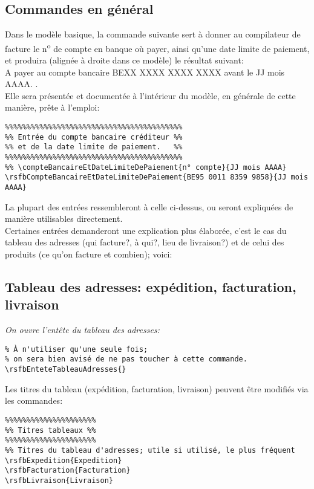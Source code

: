 \documentclass[a4paper,10pt]{article}
\begin{document}
 
\subsection{Commandes en général}

Dans le modèle basique, la commande suivante sert à donner au compilateur de facture le n\textsuperscript{o} de compte en banque où payer, ainsi qu'une date limite de paiement, et produira (alignée à droite dans ce modèle) le résultat suivant: \\

\og A payer au compte bancaire BEXX XXXX XXXX XXXX avant le JJ mois AAAA. \fg. \\

Elle sera présentée et documentée à l'intérieur du modèle, en générale de cette manière, prête à l'emploi:

\begin{lstlisting}
%%%%%%%%%%%%%%%%%%%%%%%%%%%%%%%%%%%%%%%%%
%% Entrée du compte bancaire créditeur %%
%% et de la date limite de paiement.   %%
%%%%%%%%%%%%%%%%%%%%%%%%%%%%%%%%%%%%%%%%%
%% \compteBancaireEtDateLimiteDePaiement{n° compte}{JJ mois AAAA}
\rsfbCompteBancaireEtDateLimiteDePaiement{BE95 0011 8359 9858}{JJ mois AAAA}
\end{lstlisting}

La plupart des entrées ressembleront à celle ci-dessus, ou seront expliquées de manière utilisables directement. \\

Certaines entrées demanderont une explication plus élaborée, c'est le cas du tableau des adresses (qui facture?, à qui?, lieu de livraison?) et de celui des produits (ce qu'on facture et combien); voici:


\subsection{Tableau des adresses: expédition, facturation, livraison}

\emph{On ouvre l'entête du tableau des adresses:}
\begin{lstlisting}
% À n'utiliser qu'une seule fois; 
% on sera bien avisé de ne pas toucher à cette commande.
\rsfbEnteteTableauAdresses{}
\end{lstlisting}

Les titres du tableau (expédition, facturation, livraison) peuvent être modifiés via les commandes:
\begin{lstlisting}
%%%%%%%%%%%%%%%%%%%%%
%% Titres tableaux %%
%%%%%%%%%%%%%%%%%%%%%
%% Titres du tableau d'adresses; utile si utilisé, le plus fréquent
\rsfbExpedition{Expedition}
\rsfbFacturation{Facturation}
\rsfbLivraison{Livraison}
\end{lstlisting}
\end{document}
